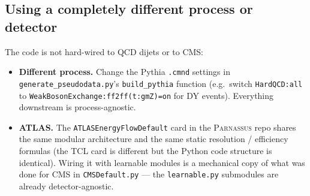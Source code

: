 \documentclass[a4paper,11pt]{article}
\begin{document}
\subsection{Using a completely different process or detector}

The code is not hard-wired to QCD dijets or to CMS:
\begin{itemize}
\item \textbf{Different process.} Change the Pythia \texttt{.cmnd}
  settings in \texttt{generate\_pseudodata.py}'s
  \texttt{build\_pythia} function (e.g.\ switch \texttt{HardQCD:all}
  to \texttt{WeakBosonExchange:ff2ff(t:gmZ)=on} for DY events).
  Everything downstream is process-agnostic.
\item \textbf{ATLAS.} The \texttt{ATLASEnergyFlowDefault} card in
  the \textsc{Parnassus} repo shares the same modular architecture
  and the same static resolution / efficiency formulas (the TCL card
  is different but the Python code structure is identical). Wiring
  it with learnable modules is a mechanical copy of what was done
  for CMS in \texttt{CMSDefault.py} --- the \texttt{learnable.py}
  submodules are already detector-agnostic.
\end{itemize}
\end{document}
